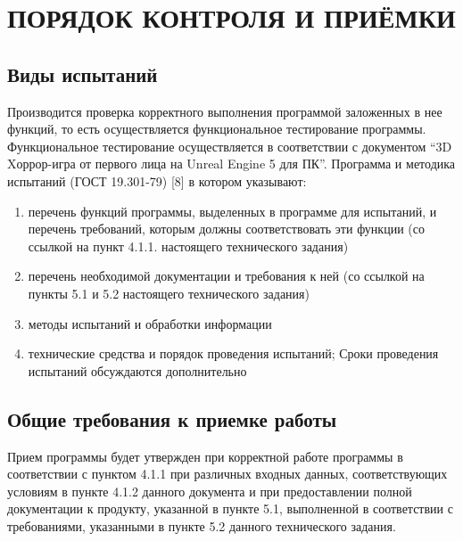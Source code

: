 \section{ПОРЯДОК КОНТРОЛЯ И ПРИЁМКИ}

\subsection{Виды испытаний}
Производится проверка корректного выполнения программой заложенных в нее функций, то есть осуществляется функциональное тестирование программы. Функциональное тестирование осуществляется в соответствии с документом ``3D Xоррор-игра от первого лица на Unreal Engine 5 для ПК''. Программа и методика испытаний (ГОСТ 19.301-79) [8] в котором указывают:
\begin{enumerate}
    \item перечень функций программы, выделенных в программе для испытаний, и перечень требований, которым должны соответствовать эти функции (со ссылкой на пункт 4.1.1. настоящего технического задания)
    \item перечень необходимой документации и требования к ней (со ссылкой на пункты 5.1 и 5.2 настоящего технического задания)
    \item методы испытаний и обработки информации
    \item технические средства и порядок проведения испытаний; Сроки проведения испытаний обсуждаются дополнительно
\end{enumerate}

\subsection{Общие требования к приемке работы}

Прием программы будет утвержден при корректной работе программы в соответствии с пунктом 4.1.1 при различных входных данных, соответствующих условиям в пункте 4.1.2 данного документа и при предоставлении полной документации к продукту, указанной в пункте 5.1, выполненной в соответствии с требованиями, указанными в пункте 5.2 данного технического задания.